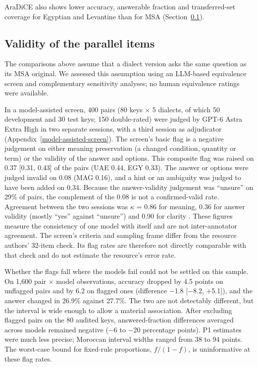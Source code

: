 \documentclass[applsci,article,submit,pdftex,oneauthor]{Definitions/mdpi}
\begin{document}
AraDiCE also shows lower accuracy, answerable fraction and transferred-set coverage for Egyptian and Levantine than for MSA (Section~\ref{validity-of-the-paired-versions-without-human-raters}).

\hypertarget{validity-of-the-paired-versions-without-human-raters}{%
\subsection{Validity of the parallel items}\label{validity-of-the-paired-versions-without-human-raters}}

The comparisons above assume that a dialect version asks the same question as its MSA original. We assessed this assumption using an LLM-based equivalence screen and complementary sensitivity analyses; no human equivalence ratings were available.

In a model-assisted screen, 400 pairs (80 keys $\times$ 5 dialects, of which 50 development and 30 test keys; 150 double-rated) were judged by GPT-6 Astra Extra High in two separate sessions, with a third session as adjudicator (Appendix~\ref{model-assisted-screen}). The screen's basic flag is a negative judgement on either meaning preservation (a changed condition, quantity or term) or the validity of the answer and options. This composite flag was raised on 0.37 {[}0.31, 0.43{]} of the pairs (UAE 0.44, EGY 0.33). The answer or options were judged invalid on 0.08 (MAG 0.16), and a hint or an ambiguity was judged to have been added on 0.34. Because the answer-validity judgement was ``unsure'' on 29\% of pairs, the complement of the 0.08 is not a confirmed-valid rate. Agreement between the two sessions was $\kappa$ = 0.86 for meaning, 0.36 for answer validity (mostly ``yes'' against ``unsure'') and 0.90 for clarity \cite{cohen1960kappa}. These figures measure the consistency of one model with itself and are not inter-annotator agreement. The screen's criteria and sampling frame differ from the resource authors' 32-item check. Its flag rates are therefore not directly comparable with that check and do not estimate the resource's error rate.

Whether the flags fall where the models fail could not be settled on this sample. On 1,600 pair $\times$ model observations, accuracy dropped by 4.5 points on unflagged pairs and by 6.2 on flagged ones (difference $-$1.8 {[}$-$8.2, +5.1{]}), and the answer changed in 26.9\% against 27.7\%. The two are not detectably different, but the interval is wide enough to allow a material association. After excluding flagged pairs on the 80 audited keys, answered-fraction differences averaged across models remained negative ($-$6 to $-$20 percentage points). P1 estimates were much less precise; Moroccan interval widths ranged from 38 to 94 points. The worst-case bound for fixed-rule proportions, $f/(1-f)$, is uninformative at these flag rates.
\end{document}
